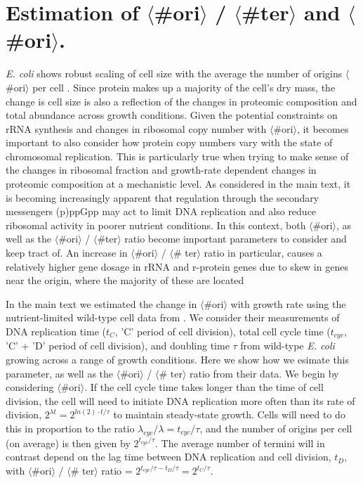 \section{Estimation of $\langle$\#ori$\rangle$ / $\langle$\#ter$\rangle$ and $\langle$\#ori$\rangle$.}

\textit{E. coli} shows robust scaling of cell size with the average the number
of origins $\langle$\#ori$\rangle$ per cell \citep{si2017}. Since protein makes
up a  majority of the cell's dry mass, the change is cell size is also a
reflection of the changes in proteomic composition and total abundance across
growth conditions. Given the potential constraints on rRNA synthesis and changes
in ribosomal copy number with $\langle$\#ori$\rangle$, it becomes important to
also consider how protein copy numbers vary with the state of chromosomal
replication. This is particularly true  when trying to make sense of the changes
in ribosomal fraction and growth-rate dependent changes in proteomic composition
at a  mechanistic level.  As considered in the main text, it is becoming
increasingly apparent that regulation through the secondary messengers (p)ppGpp
may act to limit DNA replication and also reduce ribosomal activity in poorer
nutrient conditions.  In this context, both $\langle$\#ori$\rangle$, as well as
the $\langle$\#ori$\rangle$ / $\langle$\#ter$\rangle$ ratio become important
parameters to consider and keep tract of. An increase in $\langle$\#ori$\rangle$
/ $\langle$\# ter$\rangle$ ratio  in particular, causes a relatively higher gene
dosage in rRNA and r-protein genes due to skew in genes near the origin, where
the majority of these are located

In the main text we estimated the change in $\langle$\#ori$\rangle$ with growth
rate using the nutrient-limited wild-type cell data from \cite{si2017}. We
consider their measurements of DNA replication time ($t_{C}$, 'C' period of
cell division), total cell cycle time ($t_{cyc}$, 'C' + 'D' period of cell
division), and doubling time $\tau$ from wild-type \textit{E. coli} growing
across a range of growth conditions. Here we show how we  esimate this
parameter, as well as the $\langle$\#ori$\rangle$ / $\langle$\# ter$\rangle$
ratio from their data.  We begin by considering $\langle$\#ori$\rangle$. If the
cell cycle time takes longer  than the time of cell division, the cell will need
to initiate DNA replication  more often than its rate of division, $2^{\lambda
t} = 2^{ln(2) \cdot t/ \tau}$ to maintain steady-state growth. Cells will need
to do this in proportion to the ratio $\lambda_{cyc} / \lambda =  t_{cyc}/\tau$,
and the number of origins per cell (on average) is then given by $2^{t_{cyc}/
\tau}$.   The average number of termini will in contrast depend on the lag time
between  DNA replication and cell division, $t_{D}$, with
$\langle$\#ori$\rangle$ / $\langle$\# ter$\rangle$ ratio = $2^{t_{cyc}/ \tau -
t_{D}/ \tau} =  2^{t_{C}/ \tau}$.

